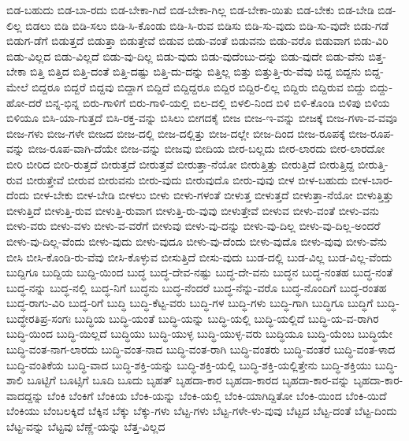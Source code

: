 {ಬಿಡ-ಬಹುದು
ಬಿಡ-ಬಾ-ರದು
ಬಿಡ-ಬೇಕಾ-ಗಿದೆ
ಬಿಡ-ಬೇಕಾ-ಗಿಲ್ಲ
ಬಿಡ-ಬೇಕಾ-ಯಿತು
ಬಿಡ-ಬೇಕು
ಬಿಡ-ಬೇಡಿ
ಬಿಡ-ಲಿಲ್ಲ
ಬಿಡಲು
ಬಿಡಿ
ಬಿಡಿ-ಸಲು
ಬಿಡಿ-ಸಿ-ಕೊಂಡು
ಬಿಡಿ-ಸಿ-ರುವ
ಬಿಡಿಸು
ಬಿಡಿ-ಸು-ವುದು
ಬಿಡಿ-ಸು-ವುದೇ
ಬಿಡು-ಗಡೆ
ಬಿಡುಗ-ಡೆಗೆ
ಬಿಡುತ್ತದೆ
ಬಿಡುತ್ತಾ
ಬಿಡುತ್ತೇವೆ
ಬಿಡುವ
ಬಿಡು-ವಂತೆ
ಬಿಡುವನು
ಬಿಡು-ವರೊ
ಬಿಡುವಾಗ
ಬಿಡು-ವಿರಿ
ಬಿಡು-ವಿಲ್ಲದ
ಬಿಡು-ವಿಲ್ಲದೆ
ಬಿಡು-ವು-ದಿಲ್ಲ
ಬಿಡು-ವುದು
ಬಿಡು-ವುದೆಂಬು-ದನ್ನು
ಬಿಡು-ವುದೇ
ಬಿಡು-ವೆನು
ಬಿತ್ತ-ಬೇಕಾ
ಬಿತ್ತಿ
ಬಿತ್ತಿದ
ಬಿತ್ತಿ-ದಂತೆ
ಬಿತ್ತಿ-ದಷ್ಟು
ಬಿತ್ತಿ-ದು-ದನ್ನು
ಬಿತ್ತಿಲ್ಲ
ಬಿತ್ತು
ಬಿತ್ತುತ್ತಿ-ರು-ವೆವು
ಬಿದ್ದ
ಬಿದ್ದನು
ಬಿದ್ದ-ಮೇಲೆ
ಬಿದ್ದರೂ
ಬಿದ್ದರೆ
ಬಿದ್ದವು
ಬಿದ್ದಾಗ
ಬಿದ್ದಿದೆ
ಬಿದ್ದಿದ್ದರೂ
ಬಿದ್ದಿರ
ಬಿದ್ದಿರ-ಲಿಲ್ಲ
ಬಿದ್ದಿರು
ಬಿದ್ದಿರುವ
ಬಿದ್ದು
ಬಿದ್ದು-ಹೋ-ದರೆ
ಬಿನ್ನ-ಭಿನ್ನ
ಬಿರು-ಗಾಳಿಗೆ
ಬಿರು-ಗಾಳಿ-ಯಲ್ಲಿ
ಬಿಲ-ದಲ್ಲಿ
ಬಿಳಲಿ-ನಿಂದ
ಬಿಳಿ
ಬಿಳಿ-ಕೊಂಡಿ
ಬಿಳಿಪು
ಬಿಳಿಯ
ಬಿಳಿಯೂ
ಬಿಸಿ-ಯಾ-ಗುತ್ತದೆ
ಬಿಸಿ-ರಕ್ತ-ವನ್ನು
ಬಿಸಿಲು
ಬೀಗದಕೈ
ಬೀಜ
ಬೀಜ-ಇ-ವನ್ನು
ಬೀಜಕ್ಕೆ
ಬೀಜ-ಗಳಾ-ವ-ವವೂ
ಬೀಜ-ಗಳು
ಬೀಜ-ಗಳೇ
ಬೀಜದ
ಬೀಜ-ದಲ್ಲಿ
ಬೀಜ-ದಲ್ಲಿತ್ತು
ಬೀಜ-ದಲ್ಲೇ
ಬೀಜ-ದಿಂದ
ಬೀಜ-ರೂಪಕ್ಕೆ
ಬೀಜ-ರೂಪ-ವನ್ನು
ಬೀಜ-ರೂಪ-ವಾಗಿ-ದೆಯೇ
ಬೀಜ-ವನ್ನು
ಬೀಜವು
ಬೀದಿಯ
ಬೀರ-ಬಲ್ಲದು
ಬೀರ-ಲಾರದು
ಬೀರ-ಲಾರದೋ
ಬೀರಿ
ಬೀರಿದ
ಬೀರಿ-ರುತ್ತದೆ
ಬೀರುತ್ತದೆ
ಬೀರುತ್ತವೆ
ಬೀರುತ್ತಾ-ನೆಯೋ
ಬೀರುತ್ತಿತ್ತು
ಬೀರುತ್ತಿದೆ
ಬೀರುತ್ತಿದ್ದ
ಬೀರುತ್ತಿ-ರುವ
ಬೀರುತ್ತೇವೆ
ಬೀರುವ
ಬೀರುವನು
ಬೀರು-ವುದು
ಬೀರುವುದೊ
ಬೀರು-ವುವು
ಬೀಳ
ಬೀಳ-ಬಹುದು
ಬೀಳ-ಬಾರ-ದೆಂದು
ಬೀಳ-ಬೇಕು
ಬೀಳ-ಬೇಡಿ
ಬೀಳಲು
ಬೀಳು
ಬೀಳು-ಗಳಂತೆ
ಬೀಳುತ್ತ
ಬೀಳುತ್ತದೆ
ಬೀಳುತ್ತಾ-ನೆಯೋ
ಬೀಳುತ್ತಿತ್ತು
ಬೀಳುತ್ತಿದೆ
ಬೀಳುತ್ತಿ-ರುವ
ಬೀಳುತ್ತಿ-ರುವಾಗ
ಬೀಳುತ್ತಿ-ರು-ವುವು
ಬೀಳುತ್ತೇವೆ
ಬೀಳುವ
ಬೀಳು-ವಂತೆ
ಬೀಳು-ವನು
ಬೀಳು-ವರು
ಬೀಳು-ವಳು
ಬೀಳು-ವ-ವರೆಗೆ
ಬೀಳುವು
ಬೀಳು-ವು-ದನ್ನು
ಬೀಳು-ವು-ದಿಲ್ಲ
ಬೀಳು-ವು-ದಿಲ್ಲ-ಅಂದರೆ
ಬೀಳು-ವು-ದಿಲ್ಲ-ವೆಂದು
ಬೀಳು-ವುದು
ಬೀಳು-ವುದೂ
ಬೀಳು-ವು-ದೆಂದು
ಬೀಳು-ವುದೊ
ಬೀಳು-ವುವು
ಬೀಳು-ವೆನು
ಬೀಸಿ
ಬೀಸಿ-ಕೊಂಡಿ-ರು-ವೆವು
ಬೀಸಿ-ಕೊಳ್ಳುವ
ಬೀಸುತ್ತಿದೆ
ಬೀಸು-ವುದು
ಬುಡ-ದಲ್ಲಿ
ಬುಡ-ವಿಲ್ಲ
ಬುಡ-ವಿಲ್ಲ-ವೆಂದು
ಬುದ್ದಿಗೂ
ಬುದ್ದಿಯ
ಬುದ್ದಿ-ಯಿಂದ
ಬುದ್ಧ
ಬುದ್ಧ-ದೇವ-ನಷ್ಟು
ಬುದ್ಧ-ದೇ-ವನು
ಬುದ್ಧನ
ಬುದ್ಧ-ನಂತಹ
ಬುದ್ಧ-ನಂತೆ
ಬುದ್ಧ-ನನ್ನು
ಬುದ್ಧ-ನಲ್ಲಿ
ಬುದ್ಧ-ನಿಗೆ
ಬುದ್ಧನು
ಬುದ್ಧ-ನೆಂದರೆ
ಬುದ್ಧ-ನೆನ್ನು-ವರೊ
ಬುದ್ಧ-ನೊಂದಿಗೆ
ಬುದ್ಧ-ರಂತಹ
ಬುದ್ಧ-ರಾಗು-ವಿರಿ
ಬುದ್ಧ-ರಿಗೆ
ಬುದ್ಧಿ
ಬುದ್ಧಿ-ಕೆಟ್ಟ-ವರು
ಬುದ್ಧಿ-ಗಳ
ಬುದ್ಧಿ-ಗಳು
ಬುದ್ಧಿ-ಗಾಗಿ
ಬುದ್ಧಿಗೂ
ಬುದ್ಧಿಗೆ
ಬುದ್ಧಿ-ಬುದ್ಧೇರತಿಪ್ರ-ಸಂಗಃ
ಬುದ್ಧಿಯ
ಬುದ್ಧಿ-ಯಂತೆ
ಬುದ್ಧಿ-ಯನ್ನು
ಬುದ್ಧಿ-ಯಲ್ಲಿ
ಬುದ್ಧಿ-ಯಲ್ಲಿದೆ
ಬುದ್ಧಿ-ಯ-ವ-ರಾಗಿರ
ಬುದ್ಧಿ-ಯಿಂದ
ಬುದ್ಧಿ-ಯಿಲ್ಲದೆ
ಬುದ್ಧಿಯು
ಬುದ್ಧಿ-ಯುಳ್ಳ
ಬುದ್ಧಿ-ಯುಳ್ಳ-ವರು
ಬುದ್ಧಿಯೂ
ಬುದ್ಧಿ-ಯೆಂಬ
ಬುದ್ಧಿಯೇ
ಬುದ್ಧಿ-ವಂತ-ನಾಗ-ಲಾರದು
ಬುದ್ಧಿ-ವಂತ-ನಾದ
ಬುದ್ಧಿ-ವಂತ-ರಾಗಿ
ಬುದ್ಧಿ-ವಂತರು
ಬುದ್ಧಿ-ವಂತರೆ
ಬುದ್ಧಿ-ವಂತ-ಳಾದ
ಬುದ್ಧಿ-ವಂತಿಕೆಯ
ಬುದ್ಧಿ-ವಾದ
ಬುದ್ಧಿ-ಶಕ್ತಿ-ಯನ್ನು
ಬುದ್ಧಿ-ಶಕ್ತಿ-ಯಲ್ಲಿ
ಬುದ್ಧಿ-ಶಕ್ತಿ-ಯಲ್ಲಿತ್ತೇನು
ಬುದ್ಧಿ-ಶಕ್ತಿಯು
ಬುದ್ಧಿ-ಶಾಲಿ
ಬೂಟ್ಟಿಗೆ
ಬೂಟ್ಸಿಗೆ
ಬೂದಿ
ಬೂದು
ಬೃಹತ್
ಬೃಹದಾ-ಕಾರ
ಬೃಹದಾ-ಕಾರದ
ಬೃಹದಾ-ಕಾರ-ವನ್ನು
ಬೃಹದಾ-ಕಾರ-ವಾದದ್ದನ್ನು
ಬೆಂಕಿ
ಬೆಂಕಿಗೆ
ಬೆಂಕಿಯ
ಬೆಂಕಿ-ಯನ್ನು
ಬೆಂಕಿ-ಯಲ್ಲಿ
ಬೆಂಕಿ-ಯಾಗಿದ್ದಿತೋ
ಬೆಂಕಿ-ಯಿಂದ
ಬೆಂಕಿ-ಯಿದೆ
ಬೆಂಕಿಯು
ಬೆಂಬಲಕ್ಕಿದೆ
ಬೆಕ್ಕಿನ
ಬೆಕ್ಕು
ಬೆಕ್ಕು-ಗಳು
ಬೆಟ್ಟ-ಗಳು
ಬೆಟ್ಟ-ಗಳೇ-ಳು-ವುವು
ಬೆಟ್ಟದ
ಬೆಟ್ಟ-ದಂತೆ
ಬೆಟ್ಟ-ದಿಂದು
ಬೆಟ್ಟ-ವನ್ನು
ಬೆಟ್ಟವು
ಬೆಣ್ಣೆ-ಯನ್ನು
ಬೆತ್ತ-ವಿಲ್ಲದ
}
